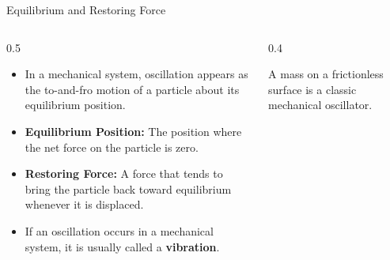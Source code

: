 \documentclass[aspectratio=169,xcolor=dvipsnames]{beamer}
\begin{document}
\begin{frame}{Equilibrium and Restoring Force}
  \begin{columns}[c]
    \begin{column}{0.5\textwidth}
      \begin{itemize}
        \item In a mechanical system, oscillation appears as the to-and-fro motion of a particle about its equilibrium position.
        \item \textbf{Equilibrium Position:} The position where the net force on the particle is zero.
        \item \textbf{Restoring Force:} A force that tends to bring the particle back toward equilibrium whenever it is displaced.
        \item If an oscillation occurs in a mechanical system, it is usually called a \textbf{vibration}.
      \end{itemize}
    \end{column}
    \begin{column}{0.4\textwidth}
      \centering
      \vfill
      \vfill
      \begin{umnote}
        A mass on a frictionless surface is a classic mechanical oscillator.
      \end{umnote}
      \vfill
    \end{column}
  \end{columns}
\end{frame}
\end{document}
